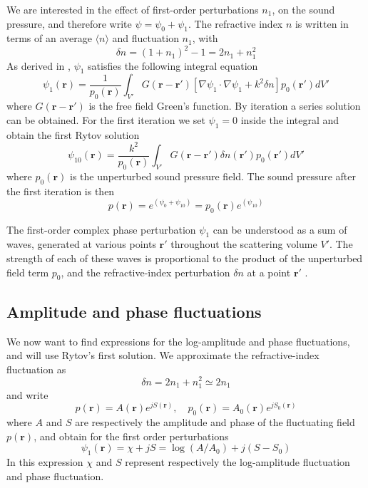 We are interested in the effect of first-order perturbations $n_1$, on the sound pressure,
and therefore write $\psi = \psi_0 + \psi_1$. The refractive index $n$ is written in terms of
an average $\langle n \rangle$ and fluctuation $n_1$, with
\begin{equation}
 \delta n = (1 + n_1)^2 -1 = 2 n_1 + n_1^2
\end{equation}
As derived in \cite{Ishimaru1997}, $\psi_{1}$ satisfies the following integral equation
\begin{equation}
 \psi_{1}(\mathbf{r}) = \frac{1}{p_0(\mathbf{r})} \int_{V'} G(\mathbf{r}-\mathbf{r}') \left[ \nabla \psi_1 \cdot \nabla \psi_1 + k^2 \delta n  \right]  p_0(\mathbf{r}') dV'
\end{equation}
where $G(\mathbf{r}-\mathbf{r}')$ is the free field Green's function. By iteration a series solution can be obtained. For the first iteration we set $\psi_1 = 0$ inside the integral and obtain the first Rytov solution
\begin{equation}
 \psi_{10}(\mathbf{r}) = \frac{k^2}{p_0(\mathbf{r})} \int_{V'} G(\mathbf{r}-\mathbf{r}') \delta n(\mathbf{r}') p_0(\mathbf{r}') dV'
\end{equation}
where $p_0(\mathbf{r})$ is the unperturbed sound pressure field. %
The sound pressure after the first iteration is then
\begin{equation}
 p (\mathbf{r}) = e^{(\psi_0 + \psi_{10})} = p_0(\mathbf{r}) e^{(\psi_{10})}
\end{equation}

The first-order complex phase perturbation $\psi_{1}$ can be understood as a sum of waves,
generated at various points $\mathbf{r}'$ throughout the scattering volume $V'$.
The strength of each of these waves is proportional to the product of the unperturbed field term ${p_0}$, and the refractive-index perturbation $\delta n$ at a point $\mathbf{r}'$ \cite{Jurado-navas2006}.

\subsection{Amplitude and phase fluctuations}
We now want to find expressions for the log-amplitude and phase fluctuations, and will use Rytov's first solution.
We approximate the refractive-index fluctuation as
\begin{equation}
 \delta n = 2 n_1 + n_1^2 \simeq 2 n_1
\end{equation}
and write
\begin{equation}\label{eq:complex_exponential}
 p(\mathbf{r}) = A(\mathbf{r}) e^{jS(\mathbf{r})},  \quad p_0(\mathbf{r}) = A_0(\mathbf{r}) e^{jS_0(\mathbf{r})}
\end{equation}
where $A$ and $S$ are respectively the amplitude and phase of the fluctuating field $p(\mathbf{r})$,
and obtain for the first order perturbations
\begin{equation}\label{eq:chi_and_S}
 \psi_1 ({\mathbf{r}}) = \chi + j S = \log{(A/A_0)} + j (S-S_0)
\end{equation}
In this expression $\chi$ and $S$ represent respectively the log-amplitude fluctuation and phase fluctuation.

